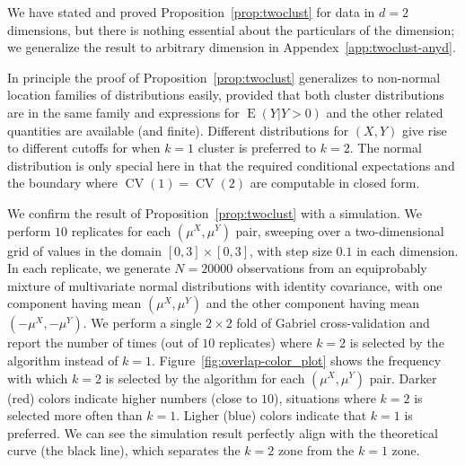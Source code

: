 \documentclass[12pt]{article}
\newcommand{\CV}{\operatorname{CV}}
\newcommand{\E}{\operatorname{E}}
\newcommand{\muX}{\mu^{X}}
\newcommand{\muY}{\mu^{Y}}
\begin{document}
We have stated and proved Proposition~\ref{prop:twoclust} for data in $d = 2$
dimensions, but there is nothing essential about the particulars of the
dimension; we generalize the result to arbitrary dimension in
Appendex~\ref{app:twoclust-anyd}.


In principle the proof of Proposition~\ref{prop:twoclust} generalizes to
non-normal location families of distributions easily, provided that
both cluster distributions are in the same family and expressions for
$\E(Y | Y > 0)$ and the other related quantities are available (and finite).
Different distributions for $(X,Y)$ give rise to different cutoffs for when $k
= 1$ cluster is preferred to $k = 2$. The normal distribution is only special
here in that the required conditional expectations and the boundary where
$\CV(1) = \CV(2)$ are computable in closed form. 



We confirm the result of Proposition~\ref{prop:twoclust} with a simulation.
We perform $10$ replicates for each $(\mu^X, \mu^Y)$ pair, sweeping over
a two-dimensional grid of values in the domain $[0,3] \times [0,3]$, with step
size $0.1$ in each dimension.  In each
replicate, we generate $N=20000$ observations from an equiprobably mixture
of multivariate normal distributions with identity covariance, with one
component having mean $(\muX, \muY)$ and
the other component having mean $(-\muX, -\muY)$. We perform a single $2 \times 2$
fold of Gabriel cross-validation and report the number of times
(out of $10$ replicates) where $k=2$ is selected by the algorithm instead of $k=1$.
Figure~\ref{fig:overlap-color_plot} shows the frequency with which $k=2$ is selected by
the algorithm for each $(\mu^X, \mu^Y)$ pair. Darker (red) colors indicate
higher numbers (close to $10$), situations where $k = 2$ is selected more
often than $k = 1$. Ligher (blue) colors indicate that $k = 1$ is preferred.
We can see the simulation result perfectly align with the
theoretical curve (the black line), which separates the $k=2$ zone from the
$k=1$ zone.
\end{document}

